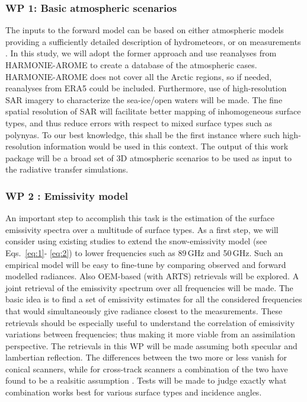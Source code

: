\documentclass[12pt,oneside,a4paper]{article}
\begin{document}
\subsubsection*{WP 1: Basic atmospheric scenarios}
%

\label{sec:atmscenes}
The inputs to the forward model can be based on either atmospheric models
providing a sufficiently detailed description of hydrometeors, or on
measurements \citep{ekelund:using:20}. In this study, we will adopt the former
approach and use reanalyses from HARMONIE-AROME to create a database of the
atmospheric cases. HARMONIE-AROME does not cover all the Arctic regions, so if
needed, reanalyses from ERA5 could be included. Furthermore, use of
high-resolution SAR imagery to characterize the sea-ice/open waters will be
made. The fine spatial resolution of SAR will facilitate better mapping of
inhomogeneous surface types, and thus reduce errors with respect to mixed
surface types such as polynyas. To our best knowledge, this shall be the first
instance where such high-resolution information would be used in this context.
The output of this work package will be a broad set of 3D atmospheric scenarios
to be used as input to the radiative transfer simulations. \vspace{-1.0ex}

\subsubsection*{WP 2 : Emissivity model}
%
\label{sec:emissivity}
An important step to accomplish this task is the estimation of the surface
emissivity spectra over a multitude of surface types. As a first step, we will
consider using existing studies to extend the snow-emissivity model (see
Eqs.~\ref{eq:1}- \ref{eq:2}) to lower frequencies such as 89\,GHz and 50\,GHz.
Such an empirical model will be easy to fine-tune by comparing observed and
forward modelled radiances. Also OEM-based (with ARTS) retrievals will be
explored. A joint retrieval of the emissivity spectrum over all frequencies
will be made. The basic idea is to find a set of emissivity estimates for all
the considered frequencies that would simultaneously give radiance closest to
the measurements. These retrievals should be especially useful to understand
the correlation of emissivity variations between frequencies; thus making it
more viable from an assimilation perspective. The retrievals in this WP will be
made assuming both specular and lambertian reflection. The differences between
the two more or less vanish for conical scanners, while for cross-track
scanners a combination of the two have found to be a realsitic assumption
\citep{matzler:2005:onthe}. Tests will be made to judge exactly what
combination works best for various surface types and incidence angles.
\end{document}

